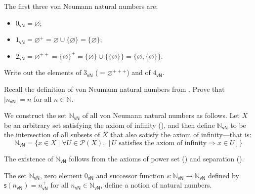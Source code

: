 \begin{example}
The first three von Neumann natural numbers are:
\begin{itemize}
\item $0_{\mathsf{vN}} = \varnothing$;
\item $1_{\mathsf{vN}} = \varnothing^+ = \varnothing \cup \{ \varnothing \} = \{ \varnothing \}$;
\item $2_{\mathsf{vN}} = \varnothing^{++} = \{ \varnothing \}^+ = \{ \varnothing \} \cup \{ \{ \varnothing \} \} = \{ \varnothing, \{ \varnothing \} \}$.
\end{itemize}
\end{example}

\begin{exercise}
Write out the elements of $3_{\mathsf{vN}}$ ($=\varnothing^{+++}$) and of $4_{\mathsf{vN}}$.
\end{exercise}

\begin{exercise}
\label{exSizeOfVonNeumannOrdinals}
Recall the definition of von Neumann natural numbers from . Prove that $|n_{\mathsf{vN}}| = n$ for all $n \in \mathbb{N}$.
\end{exercise}

\begin{construction}
\label{cnsNaturalNumbersVonNeumann}
We construct the set $\mathbb{N}_{\mathsf{vN}}$ of all von Neumann natural numbers as follows. Let $X$ be an arbitrary set satisfying the axiom of infinity (), and then define $\mathbb{N}_{\mathsf{vN}}$ to be the intersection of all subsets of $X$ that also satisfy the axiom of infinity---that is:
\[ \mathbb{N}_{\mathsf{vN}} = \{ x \in X \mid \forall U \in \mathcal{P}(X),\, [U \text{ satisfies the axiom of infinity} \Rightarrow x \in U ] \} \]
\end{construction}

The existence of $\mathbb{N}_{\mathsf{vN}}$ follows from the axioms of power set () and separation ().

\begin{theorem}
\label{thmVonNeumannNaturalNumbers}
The set $\mathbb{N}_{\mathsf{vN}}$, zero element $0_{\mathsf{vN}}$ and successor function $s : \mathbb{N}_{\mathsf{vN}} \to \mathbb{N}_{\mathsf{vN}}$ defined by $\mathsf{s}(n_{\mathsf{vN}}) = n_{\mathsf{vN}}^+$ for all $n_{\mathsf{vN}} \in \mathbb{N}_{\mathsf{vN}}$, define a notion of natural numbers.
\end{theorem}

